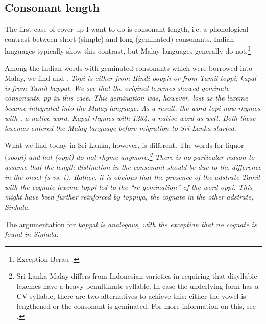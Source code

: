 \documentclass[a4paper,10pt]{article}
\begin{document}
\subsection{Consonant length} 
The first case of cover-up I want to do is consonant length, i.e. a phonological contrast between short (simple) and long (geminated) consonants. Indian languages typically show this contrast, but Malay languages generally do not.\footnote{Exception
 Berau \citep{abc}.
}

Among the Indian words with geminated consonants which were borrowed into Malay, we find   and . \em Topi \em is either from Hindi \em {\tz}ooppii \em or from Tamil \em toppi\em, \em kapal \em is from Tamil \em kappal\em. We see that the original lexemes showed geminate consonants, \em pp \em in this case. This gemination was, however, lost as the lexeme became integrated into the Malay language. As a result, the word \em topi \em now rhymes with , a native word. \em Kapal \em rhymes with \em 1234\em, a native word as well. Both these lexemes entered the Malay language before migration to Sri Lanka started.

What we find today in Sri Lanka, however, is different. The words for liquor (\em soopi\em) and hat (\em {\dentt}oppi\em) do not rhyme anymore.\footnote{Sri
 Lanka Malay differs from Indonesian varieties in requiring that disyllabic lexemes have  a heavy penultimate syllable. In case the underlying form has a  CV syllable, there are two alternatives to achieve this: either the vowel is lengthened or the consonant is geminated. For more information on this, see \citet{Nordhoff2009phd}.
} 
There is no particular reason to assume that the length distinction in the consonant should be due to the difference in the onset (\em s \em vs. \em t\em). Rather, it is obvious that the presence of the adstrate Tamil with the cognate lexeme \em toppi \em led to the ``re-gemination'' of the word \em {\dentt}oppi\em. This might have been further reinforced by \em toppiya\em, the cognate in the other adstrate, Sinhala. 

The argumentation for \em kappal \em is analogous, with the exception that no cognate is found in Sinhala. 


\end{document}
